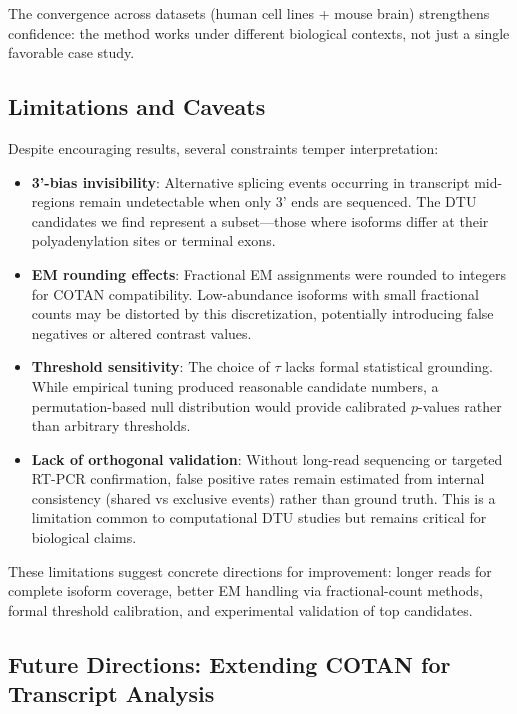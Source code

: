 The convergence across datasets (human cell lines + mouse brain) strengthens confidence: the method works under different biological contexts, not just a single favorable case study.

\subsection*{Limitations and Caveats}

Despite encouraging results, several constraints temper interpretation:
\begin{itemize}
    \item \textbf{3'-bias invisibility}: Alternative splicing events occurring in transcript mid-regions remain undetectable when only 3' ends are sequenced. The DTU candidates we find represent a subset---those where isoforms differ at their polyadenylation sites or terminal exons.

    \item \textbf{EM rounding effects}: Fractional EM assignments were rounded to integers for COTAN compatibility. Low-abundance isoforms with small fractional counts may be distorted by this discretization, potentially introducing false negatives or altered contrast values.

    \item \textbf{Threshold sensitivity}: The choice of $\tau$ lacks formal statistical grounding. While empirical tuning produced reasonable candidate numbers, a permutation-based null distribution would provide calibrated $p$-values rather than arbitrary thresholds.

    \item \textbf{Lack of orthogonal validation}: Without long-read sequencing or targeted RT-PCR confirmation, false positive rates remain estimated from internal consistency (shared vs exclusive events) rather than ground truth. This is a limitation common to computational DTU studies but remains critical for biological claims.
\end{itemize}

These limitations suggest concrete directions for improvement: longer reads for complete isoform coverage, better EM handling via fractional-count methods, formal threshold calibration, and experimental validation of top candidates.

\subsection*{Future Directions: Extending COTAN for Transcript Analysis}

